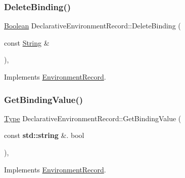 \subsubsection{\texorpdfstring{Delete\+Binding()}{DeleteBinding()}\hspace{0.1cm}{\footnotesize\ttfamily [2/2]}}
{\footnotesize\ttfamily \hyperlink{struct_boolean}{Boolean} Declarative\+Environment\+Record\+::\+Delete\+Binding (\begin{DoxyParamCaption}\item[{const \hyperlink{struct_string}{String} \&}]{ }\end{DoxyParamCaption})\hspace{0.3cm}{\ttfamily [final]}, {\ttfamily [virtual]}}



Implements \hyperlink{struct_environment_record_ac8fe8ad8e0146d5d7e3d9c0f3d873717}{Environment\+Record}.

\mbox{\label{struct_declarative_environment_record_a53765619db78e907bf5b0da354b2c7fc}} 
\subsubsection{\texorpdfstring{Get\+Binding\+Value()}{GetBindingValue()}\hspace{0.1cm}{\footnotesize\ttfamily [1/2]}}
{\footnotesize\ttfamily \hyperlink{class_type}{Type} Declarative\+Environment\+Record\+::\+Get\+Binding\+Value (\begin{DoxyParamCaption}\item[{const \textbf{ std\+::string} \&.}]{bool }\end{DoxyParamCaption})\hspace{0.3cm}{\ttfamily [final]}, {\ttfamily [virtual]}}



Implements \hyperlink{struct_environment_record_afd78e04157f5d84cac025d2b0c867b4e}{Environment\+Record}.

\mbox{\label{struct_declarative_environment_record_a886564d5370eb7b2b48a5616c4d1d33a}} 
